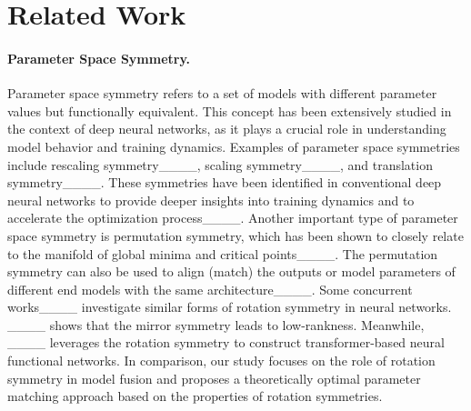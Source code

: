 \section{Related Work}
\paragraph{Parameter Space Symmetry.}
Parameter space symmetry refers to a set of models with different parameter values but functionally equivalent. This concept has been extensively studied in the context of deep neural networks, as it plays a crucial role in understanding model behavior and training dynamics. %
Examples of parameter space symmetries include rescaling symmetry____, scaling symmetry____, and translation symmetry____. These symmetries have been identified in conventional deep neural networks to provide deeper insights into training dynamics and to accelerate the optimization process____. Another important type of parameter space symmetry is permutation symmetry, which has been shown to closely relate to the manifold of global minima and critical points____. The permutation symmetry can also be used to align (match) the outputs or model parameters of different end models with the same architecture____.
Some concurrent works____ investigate similar forms of rotation symmetry in neural networks.
____ shows that the mirror symmetry leads to low-rankness. 
Meanwhile, ____ leverages the rotation symmetry to construct transformer-based neural functional networks.
In comparison, our study focuses on the role of rotation symmetry in model fusion and proposes a theoretically optimal parameter matching approach based on the properties of rotation symmetries.

